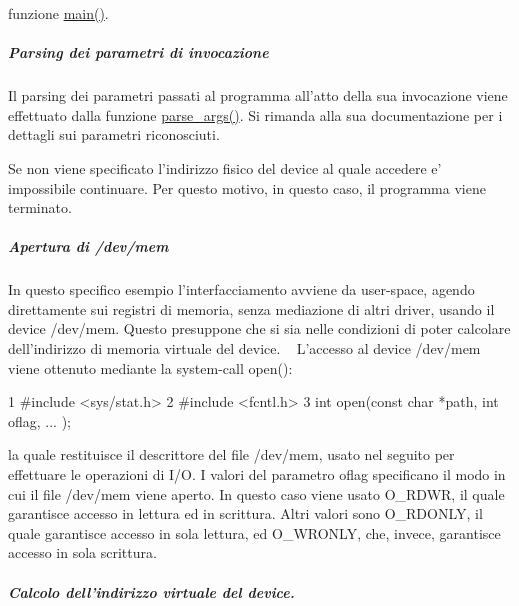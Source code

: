 funzione \hyperlink{group___no_driver_ga3c04138a5bfe5d72780bb7e82a18e627}{main()}. 

\subparagraph*{Parsing dei parametri di invocazione}

Il parsing dei parametri passati al programma all'atto della sua invocazione viene effettuato dalla funzione \hyperlink{group___no_driver_ga218f8a9dfc36572bfe2230c5e2d2c776}{parse\+\_\+args()}. Si rimanda alla sua documentazione per i dettagli sui parametri riconosciuti.

Se non viene specificato l'indirizzo fisico del device al quale accedere e' impossibile continuare. Per questo motivo, in questo caso, il programma viene terminato.

\subparagraph*{Apertura di /dev/mem}

In questo specifico esempio l'interfacciamento avviene da user-\/space, agendo direttamente sui registri di memoria, senza mediazione di altri driver, usando il device /dev/mem. Questo presuppone che si sia nelle condizioni di poter calcolare dell'indirizzo di memoria virtuale del device. ~\newline
 L'accesso al device /dev/mem viene ottenuto mediante la system-\/call open()\+: 
\begin{DoxyCode}
1 #include <sys/stat.h>
2 #include <fcntl.h>
3 int open(const char *path, int oflag, ...  );
\end{DoxyCode}
 la quale restituisce il descrittore del file /dev/mem, usato nel seguito per effettuare le operazioni di I/\+O. I valori del parametro oflag specificano il modo in cui il file /dev/mem viene aperto. In questo caso viene usato O\+\_\+\+R\+D\+W\+R, il quale garantisce accesso in lettura ed in scrittura. Altri valori sono O\+\_\+\+R\+D\+O\+N\+L\+Y, il quale garantisce accesso in sola lettura, ed O\+\_\+\+W\+R\+O\+N\+L\+Y, che, invece, garantisce accesso in sola scrittura.

\subparagraph*{Calcolo dell'indirizzo virtuale del device.}

